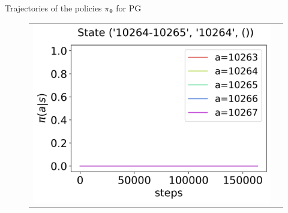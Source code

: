\documentclass[10pt, aspectratio=169, compress, protectframetitle, handout]{beamer}
\begin{document}
\begin{frame}{Trajectories of the policies $\pi_{\boldsymbol \theta}$ for PG}
\begin{figure}
\begin{tabular}{cc}
            \hspace*{-18pt}\includegraphics[scale=0.34,valign=b]{figures/policy_PG_state_3.png}
        \end{tabular}
    \end{figure}
    
\end{frame}
\end{document}

